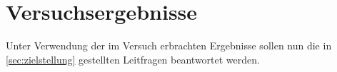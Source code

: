 \section{Versuchsergebnisse}

Unter Verwendung der im Versuch erbrachten Ergebnisse sollen nun die in \cref{sec:zielstellung} gestellten Leitfragen beantwortet werden.







